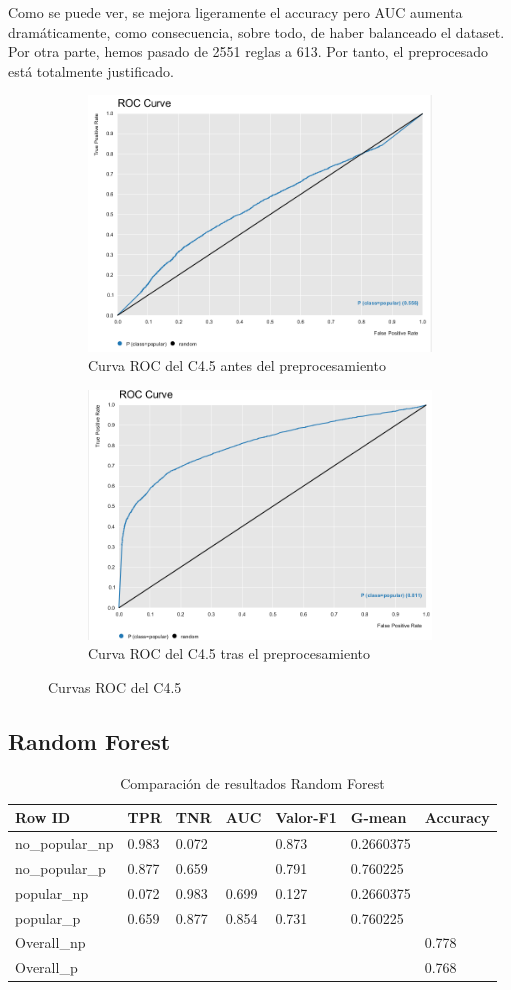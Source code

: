 Como se puede ver, se mejora ligeramente el accuracy pero AUC aumenta dramáticamente, como consecuencia, sobre todo, de haber balanceado el dataset. Por otra parte, hemos pasado de 2551 reglas a 613. Por tanto, el preprocesado está totalmente justificado.

\begin{figure}[H]
	\begin{subfigure}{.5\textwidth}
		\centering
		\includegraphics[width=.4\linewidth]{roc-c45-p.png}
		\caption{Curva ROC del C4.5 antes del preprocesamiento}
		\label{fig:rc45p}
	\end{subfigure}%
	\begin{subfigure}{.5\textwidth}
		\centering
		\includegraphics[width=.4\linewidth]{roc-c45.png}
		\caption{Curva ROC del C4.5 tras el preprocesamiento}
		\label{fig:rc45}
	\end{subfigure}
	\caption{Curvas ROC del C4.5}
	\label{fig:c4.5}
\end{figure}

\subsection{Random Forest}

\begin{table}[H]
	\centering
	\begin{tabular}{|l|l|l|l|l|l|l|}
		\hline
		Row ID          & TPR   & TNR   & AUC   & Valor-F1 & G-mean    & Accuracy \\ \hline
		no\_popular\_np & 0.983 & 0.072 &       & 0.873    & 0.2660375 &          \\ \hline
		no\_popular\_p  & 0.877 & 0.659 &       & 0.791    & 0.760225  &          \\ \hline
		popular\_np     & 0.072 & 0.983 & 0.699 & 0.127    & 0.2660375 &          \\ \hline
		popular\_p      & 0.659 & 0.877 & 0.854 & 0.731    & 0.760225  &          \\ \hline
		Overall\_np     &       &       &       &          &           & 0.778    \\ \hline
		Overall\_p      &       &       &       &          &           & 0.768    \\ \hline
	\end{tabular}
	\caption{Comparación de resultados Random Forest}
	\label{tab:comprf}
\end{table}

